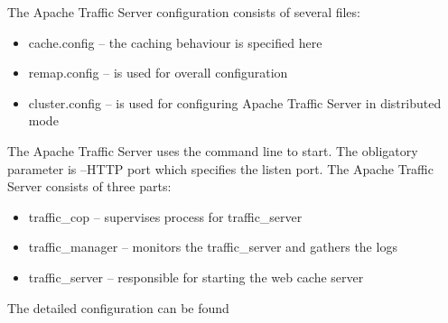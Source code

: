 The Apache Traffic Server configuration consists of several files: 

\begin{itemize}
	\item cache.config -- the caching behaviour is specified here
	\item remap.config  -- is used for overall configuration
	\item cluster.config -- is used for configuring Apache Traffic Server in distributed mode
\end{itemize}

The Apache Traffic Server uses the command line to start. The obligatory parameter is --HTTP port which specifies the listen port. The Apache Traffic Server consists of three parts:

\begin{itemize}
	\item traffic\_cop -- supervises process for traffic\_server 
	\item traffic\_manager -- monitors the traffic\_server and gathers the logs
	\item traffic\_server -- responsible for starting the web cache server
\end{itemize}

The detailed configuration can be found \cite{ats_site}

\newpage